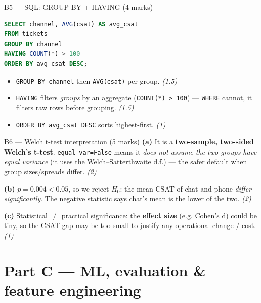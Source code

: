 \documentclass[aspectratio=169,11pt]{beamer}
\begin{document}
\begin{frame}[fragile]{B5 --- SQL: GROUP BY + HAVING (4 marks)}
\begin{lstlisting}[language=SQL]
SELECT channel, AVG(csat) AS avg_csat
FROM tickets
GROUP BY channel
HAVING COUNT(*) > 100
ORDER BY avg_csat DESC;
\end{lstlisting}
\begin{itemize}
  \item \texttt{GROUP BY channel} then \texttt{AVG(csat)} per group. \hfill \emph{(1.5)}
  \item \textcolor{cgreen}{\texttt{HAVING}} filters \emph{groups} by an aggregate
        (\texttt{COUNT(*) > 100}) --- \texttt{WHERE} cannot, it filters raw rows before
        grouping. \hfill \emph{(1.5)}
  \item \texttt{ORDER BY avg\_csat DESC} sorts highest-first. \hfill \emph{(1)}
\end{itemize}
\end{frame}

\begin{frame}{B6 --- Welch t-test interpretation (5 marks)}
\textbf{(a)} It is a \textbf{two-sample, two-sided Welch's t-test}.
\texttt{equal\_var=False} means it \emph{does not assume the two groups have equal variance}
(it uses the Welch--Satterthwaite d.f.) --- the safer default when group sizes/spreads
differ. \hfill \emph{(2)}

\textbf{(b)} $p = 0.004 < 0.05$, so we \textcolor{cgreen}{reject $H_0$}: the mean CSAT of chat and
phone \emph{differ significantly}. The negative statistic says chat's mean is the lower of the
two. \hfill \emph{(2)}

\textbf{(c)} Statistical $\neq$ practical significance: the \textbf{effect size} (e.g. Cohen's d)
could be tiny, so the CSAT gap may be too small to justify any operational change / cost.
\hfill \emph{(1)}
\end{frame}

\section{Part C --- ML, evaluation \& feature engineering}
\end{document}

